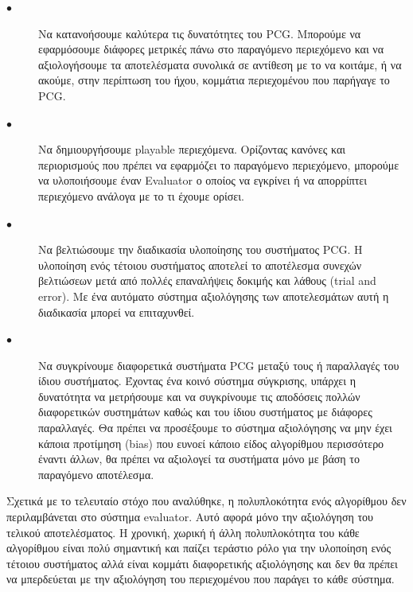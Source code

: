 \begin{description}
  \item[$\bullet$] Να κατανοήσουμε καλύτερα τις δυνατότητες του PCG. Μπορούμε να εφαρμόσουμε διάφορες μετρικές πάνω στο παραγόμενο περιεχόμενο και να αξιολογήσουμε τα αποτελέσματα συνολικά σε αντίθεση με το να κοιτάμε, ή να ακούμε, στην περίπτωση του ήχου, κομμάτια περιεχομένου που παρήγαγε το PCG.
    \item[$\bullet$] Να δημιουργήσουμε playable περιεχόμενα. Ορίζοντας κανόνες και περιορισμούς που πρέπει να εφαρμόζει το παραγόμενο περιεχόμενο, μπορούμε να υλοποιήσουμε έναν Εvaluator ο οποίος να εγκρίνει ή να απορρίπτει περιεχόμενο ανάλογα με το τι έχουμε ορίσει.
    \item[$\bullet$] Να βελτιώσουμε την διαδικασία υλοποίησης του συστήματος PCG. Η υλοποίηση ενός τέτοιου συστήματος αποτελεί το αποτέλεσμα συνεχών βελτιώσεων μετά από πολλές επαναλήψεις δοκιμής και λάθους (trial and error). Με ένα αυτόματο σύστημα αξιολόγησης των αποτελεσμάτων αυτή η διαδικασία μπορεί να επιταχυνθεί.
    \item[$\bullet$] Να συγκρίνουμε διαφορετικά συστήματα PCG μεταξύ τους ή παραλλαγές του ίδιου συστήματος. Έχοντας ένα κοινό σύστημα σύγκρισης, υπάρχει η δυνατότητα να μετρήσουμε και να συγκρίνουμε τις αποδόσεις πολλών διαφορετικών συστημάτων καθώς και του ίδιου συστήματος με διάφορες παραλλαγές. Θα πρέπει να προσέξουμε το σύστημα αξιολόγησης να μην έχει κάποια προτίμηση (bias) που ευνοεί κάποιο είδος αλγορίθμου περισσότερο έναντι άλλων, θα πρέπει να αξιολογεί τα συστήματα μόνο με βάση το παραγόμενο αποτέλεσμα.
\end{description}
\par
Σχετικά με το τελευταίο στόχο που αναλύθηκε, η πολυπλοκότητα ενός αλγορίθμου δεν περιλαμβάνεται στο σύστημα evaluator. Αυτό αφορά μόνο την αξιολόγηση του τελικού αποτελέσματος. Η χρονική, χωρική ή άλλη πολυπλοκότητα του κάθε αλγορίθμου είναι πολύ σημαντική και παίζει τεράστιο ρόλο για την υλοποίηση ενός τέτοιου συστήματος αλλά είναι κομμάτι διαφορετικής αξιολόγησης και δεν θα πρέπει να μπερδεύεται με την αξιολόγηση του περιεχομένου που παράγει το κάθε σύστημα.

